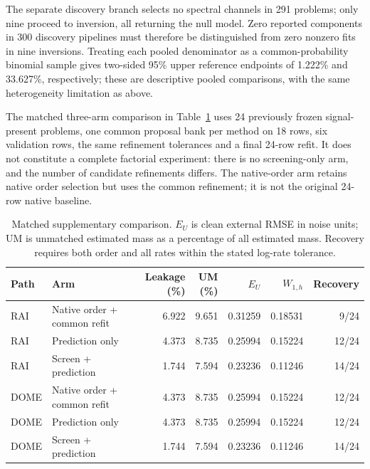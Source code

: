 The separate discovery branch selects no spectral channels in 291 problems;
only nine proceed to inversion, all returning the null model. Zero reported
components in 300 discovery pipelines must therefore be distinguished from
zero nonzero fits in nine inversions. Treating each pooled denominator as a
common-probability binomial sample gives two-sided 95\% upper reference
endpoints of 1.222\% and 33.627\%, respectively; these are descriptive pooled
comparisons, with the same heterogeneity limitation as above.

The matched three-arm comparison in Table~\ref{tab:revisionablation} uses
24 previously frozen signal-present problems, one common proposal bank per
method on 18 rows, six validation rows, the same refinement tolerances and
a final 24-row refit. It does not constitute a complete factorial experiment:
there is no screening-only arm, and the number of candidate refinements differs.
The native-order arm retains native order selection but uses the common
refinement; it is not the original 24-row native baseline.

\begin{table}[htbp]\centering\small
\caption{Matched supplementary comparison. $E_U$ is clean external RMSE in
noise units; UM is unmatched estimated mass as a percentage of all estimated
mass. Recovery requires both order and all rates within the stated
log-rate tolerance.}\label{tab:revisionablation}
\begin{tabularx}{\linewidth}{@{}lXrrrrr@{}}\toprule
Path & Arm & \shortstack[r]{Leakage\\(\%)} & \shortstack[r]{UM\\(\%)} & $E_U$ & $W_{1,h}$ & Recovery\\\midrule
RAI & Native order + common refit & 6.922 & 9.651 & 0.31259 & 0.18531 & 9/24\\
RAI & Prediction only & 4.373 & 8.735 & 0.25994 & 0.15224 & 12/24\\
RAI & Screen + prediction & 1.744 & 7.594 & 0.23236 & 0.11246 & 14/24\\
DOME & Native order + common refit & 4.373 & 8.735 & 0.25994 & 0.15224 & 12/24\\
DOME & Prediction only & 4.373 & 8.735 & 0.25994 & 0.15224 & 12/24\\
DOME & Screen + prediction & 1.744 & 7.594 & 0.23236 & 0.11246 & 14/24\\\bottomrule
\end{tabularx}
\end{table}


